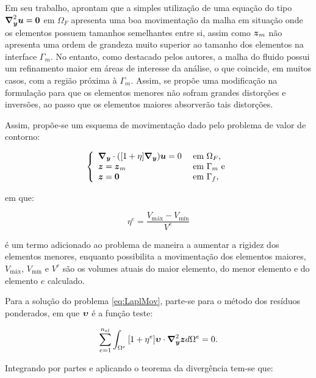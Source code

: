 Em seu trabalho,  aprontam que a simples utilização de uma equação do tipo $\boldsymbol{\nabla}^2_{\boldsymbol{y}}\boldsymbol{u}=\boldsymbol{0}$ em $\Omega_F$ apresenta uma boa movimentação da malha em situação onde os elementos possuem tamanhos semelhantes entre si, assim como $\boldsymbol{z}_m$ não apresenta uma ordem de grandeza muito superior ao tamanho dos elementos na interface $\Gamma_m$. No entanto, como destacado pelos autores, a malha do fluido possui um refinamento maior em áreas de interesse da análise, o que coincide, em muitos casos, com a região próxima à $\Gamma_m$. Assim, se propõe uma modificação na formulação para que os elementos menores não sofram grandes distorções e inversões, ao passo que os elementos maiores absorverão tais distorções.

Assim, propõe-se um esquema de movimentação dado pelo problema de valor de contorno:

\begin{equation}
    \left\{
    \begin{array}{ll}
        \boldsymbol{\nabla_y}\cdot([1+\eta]\boldsymbol{\nabla_y})\boldsymbol{u}=0 & \text{ em }\Omega_F\text{,}  \\
        \boldsymbol{z}=\boldsymbol{z}_m               & \text{ em }\Gamma_m\text{ e} \\
        \boldsymbol{z}=\boldsymbol{0}                 & \text{ em }\Gamma_f\text{,}
    \end{array}
    \right.\label{eq:LaplMov}
\end{equation}

\noindent em que:

\begin{equation}
    \eta^e=\frac{V_\mathrm{máx}-V_\mathrm{mín}}{V^e}
\end{equation}

\noindent é um termo adicionado ao problema de maneira a aumentar a rigidez dos elementos menores, enquanto possibilita a movimentação dos elementos maiores, $V_\mathrm{máx}$, $V_\mathrm{mín}$ e $V^e$ são os volumes atuais do maior elemento, do menor elemento e do elemento $e$ calculado.

Para a solução do problema \eqref{eq:LaplMov}, parte-se para o método dos resíduos ponderados, em que $\boldsymbol{\upsilon}$ é a função teste:

\begin{equation}
    \sum_{e=1}^{n_{el}}{\int_{\Omega^e}{[1+\eta^e]\boldsymbol{\upsilon}\cdot\boldsymbol{\nabla}^2_{\boldsymbol{y}}\boldsymbol{z} d\Omega^e}}=0\text{.}
\end{equation}

Integrando por partes e aplicando o teorema da divergência tem-se que:


